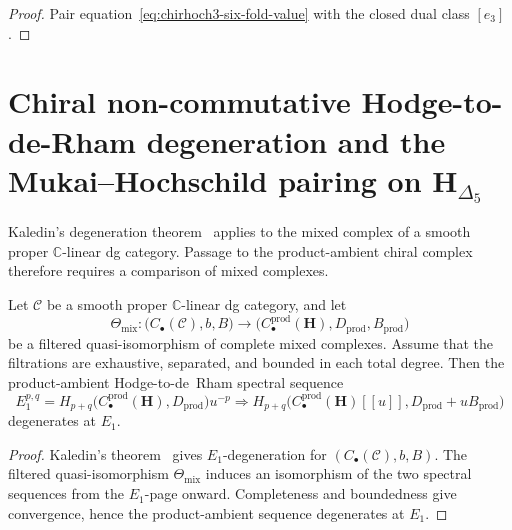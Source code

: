 \begin{proof}
Pair equation~\eqref{eq:chirhoch3-six-fold-value} with the closed dual
class $[e_3]$.
\end{proof}

\section{Chiral non-commutative Hodge-to-de-Rham degeneration and the
Mukai--Hochschild pairing on $\mathbf H_{\Delta_5}$}
\label{sec:chirhoch-mukai-nc-hodge}

\providecommand{\ChirHP}{\mathrm{ChirHP}}
\providecommand{\ChirHCneg}{\mathrm{ChirHC}^{-}}
\providecommand{\ChirHCper}{\mathrm{ChirHC}^{\mathrm{per}}}
\providecommand{\NCHodge}{\mathrm{NC\text{-}Hodge}}
\providecommand{\KalDeg}{\mathrm{Kal}}
\providecommand{\FacInf}{\mathrm{Fac}^\infty}
\providecommand{\MukPair}{\langle\,\cdot\,,\,\cdot\,\rangle_{\Muk}}
\providecommand{\sSer}{\mathbb S_{\mathrm{CY}_3}}
\providecommand{\KoszLoc}{\Uadm}
\providecommand{\ConnesB}{B}

Kaledin's degeneration theorem~\cite{Kal08} applies to the mixed complex of a smooth
proper \(\mathbb C\)-linear dg category.  Passage to the
product-ambient chiral complex therefore requires a comparison of mixed
complexes.

\begin{theorem}
\label{thm:chi-hodge-derham-degenerate-delta5}
\ClaimStatusConditional
Let \(\mathcal C\) be a smooth proper \(\mathbb C\)-linear dg category,
and let
\[
 \Theta_{\mathrm{mix}}\colon
 \bigl(C_\bullet(\mathcal C),b,B\bigr)
 \longrightarrow
 \bigl(C^{\mathrm{prod}}_\bullet(\mathbf H),
       D_{\mathrm{prod}},B_{\mathrm{prod}}\bigr)
\]
be a filtered quasi-isomorphism of complete mixed complexes.  Assume
that the filtrations are exhaustive, separated, and bounded in each
total degree.  Then the product-ambient Hodge-to-de~Rham spectral
sequence
\begin{equation}
\label{eq:chiral-hodge-de-rham-SS}
 E_1^{p,q}
 =
 H_{p+q}\bigl(C^{\mathrm{prod}}_\bullet(\mathbf H),
 D_{\mathrm{prod}}\bigr)u^{-p}
 \Longrightarrow
 H_{p+q}\bigl(
 C^{\mathrm{prod}}_\bullet(\mathbf H)[[u]],
 D_{\mathrm{prod}}+uB_{\mathrm{prod}}\bigr)
\end{equation}
degenerates at \(E_1\).
\end{theorem}

\begin{proof}
Kaledin's theorem~\cite{Kal08} gives \(E_1\)-degeneration for
\((C_\bullet(\mathcal C),b,B)\).  The filtered quasi-isomorphism
\(\Theta_{\mathrm{mix}}\) induces an isomorphism of the two spectral
sequences from the \(E_1\)-page onward.  Completeness and boundedness
give convergence, hence the product-ambient sequence degenerates at
\(E_1\).
\end{proof}


